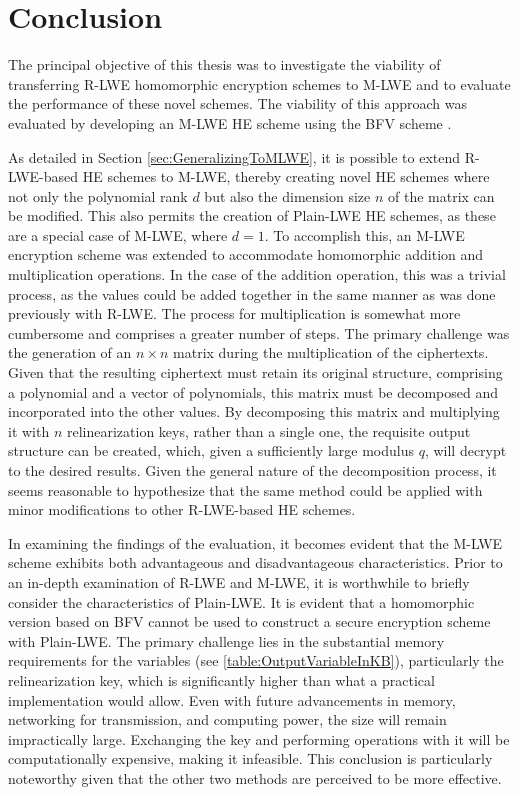 \chapter{Conclusion}

The principal objective of this thesis was to investigate the viability of transferring R-LWE homomorphic encryption schemes to M-LWE and to evaluate the performance of these novel schemes. The viability of this approach was evaluated by developing an M-LWE HE scheme using the BFV scheme \cite{BFV}.
 
As detailed in Section \ref{sec:GeneralizingToMLWE}, it is possible to extend R-LWE-based HE schemes to M-LWE, thereby creating novel HE schemes where not only the polynomial rank $d$ but also the dimension size $n$ of the matrix can be modified. This also permits the creation of Plain-LWE HE schemes, as these are a special case of M-LWE, where $d=1$. To accomplish this, an M-LWE encryption scheme was extended to accommodate homomorphic  addition and multiplication operations. In the case of the addition operation, this was a trivial process, as the values could be added together in the same manner as was done previously with R-LWE. The process for multiplication is somewhat more cumbersome and comprises a greater number of steps. The primary challenge was the generation of an $n \times n$ matrix during the multiplication of the ciphertexts. Given that the resulting ciphertext must retain its original structure, comprising a polynomial and a vector of polynomials, this matrix must be decomposed and incorporated into the other values. By decomposing this matrix and multiplying it with $n$ relinearization keys, rather than a single one, the requisite output structure can be created, which, given a sufficiently large modulus $q$, will decrypt to the desired results. Given the general nature of the decomposition process, it seems reasonable to hypothesize that the same method could be applied with minor modifications to other R-LWE-based HE schemes.


In examining the findings of the evaluation, it becomes evident that the M-LWE scheme exhibits both advantageous and disadvantageous characteristics. Prior to an in-depth examination of R-LWE and M-LWE, it is worthwhile to briefly consider the characteristics of Plain-LWE. It is evident that a homomorphic version based on BFV cannot be used to construct a secure encryption scheme with Plain-LWE. The primary challenge lies in the substantial memory requirements for the variables (see \ref{table:OutputVariableInKB}), particularly the relinearization key, which is significantly higher than what a practical implementation would allow. Even with future advancements in memory, networking for transmission, and computing power, the size will remain impractically large. Exchanging the key and performing operations with it will be computationally expensive, making it infeasible. This conclusion is particularly noteworthy given that the other two methods are perceived to be more effective.

